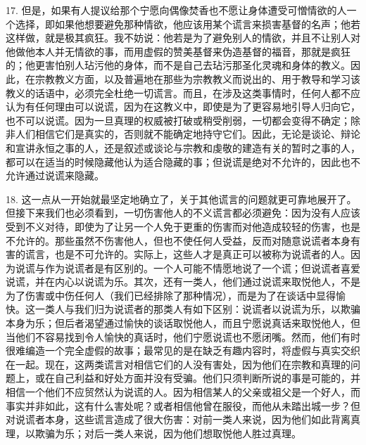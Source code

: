 17. 但是，如果有人提议给那个宁愿向偶像焚香也不愿让身体遭受可憎情欲的人一个选择，即如果他想要避免那种情欲，他应该用某个谎言来损害基督的名声；他若这样做，就是极其疯狂。我不妨说：他若是为了避免别人的情欲，并且不让别人对他做他本人并无情欲的事，而用虚假的赞美基督来伪造基督的福音，那就是疯狂的；他更害怕别人玷污他的身体，而不是自己去玷污那圣化灵魂和身体的教义。因此，在宗教教义方面，以及普遍地在那些为宗教教义而说出的、用于教导和学习该教义的话语中，必须完全杜绝一切谎言。而且，在涉及这类事情时，任何人都不应认为有任何理由可以说谎，因为在这教义中，即使是为了更容易地引导人归向它，也不可以说谎。因为一旦真理的权威被打破或稍受削弱，一切都会变得不确定；除非人们相信它们是真实的，否则就不能确定地持守它们。因此，无论是谈论、辩论和宣讲永恒之事的人，还是叙述或谈论与宗教和虔敬的建造有关的暂时之事的人，都可以在适当的时候隐藏他认为适合隐藏的事；但说谎是绝对不允许的，因此也不允许通过说谎来隐藏。\par

18. 这一点从一开始就最坚定地确立了，关于其他谎言的问题就更可靠地展开了。但接下来我们也必须看到，一切伤害他人的不义谎言都必须避免：因为没有人应该受到不义对待，即使为了让另一个人免于更重的伤害而对他造成较轻的伤害，也是不允许的。那些虽然不伤害他人，但也不使任何人受益，反而对随意说谎者本身有害的谎言，也是不可允许的。实际上，这些人才是真正可以被称为说谎者的人。因为说谎与作为说谎者是有区别的。一个人可能不情愿地说了一个谎；但说谎者喜爱说谎，并在内心以说谎为乐。其次，还有一类人，他们通过说谎来取悦他人，不是为了伤害或中伤任何人（我们已经排除了那种情况），而是为了在谈话中显得愉快。这一类人与我们归为说谎者的那类人有如下区别：说谎者以说谎为乐，以欺骗本身为乐；但后者渴望通过愉快的谈话取悦他人，而且宁愿说真话来取悦他人，但当他们不容易找到令人愉快的真话时，他们宁愿说谎也不愿闭嘴。然而，他们有时很难编造一个完全虚假的故事；最常见的是在缺乏有趣内容时，将虚假与真实交织在一起。现在，这两类谎言对相信它们的人没有害处，因为他们在宗教和真理的问题上，或在自己利益和好处方面并没有受骗。他们只须判断所说的事是可能的，并相信一个他们不应贸然认为说谎的人。因为相信某人的父亲或祖父是一个好人，而事实并非如此，这有什么害处呢？或者相信他曾在服役，而他从未踏出城一步？但对说谎者本身，这些谎言造成了很大伤害：对前一类人来说，因为他们如此背离真理，以欺骗为乐；对后一类人来说，因为他们想取悦他人胜过真理。\par

